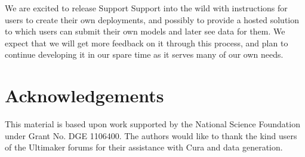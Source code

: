 \documentclass{sigchi}
\begin{document}
We are excited to release Support Support into the wild with instructions for users to create their own deployments, and possibly to provide a hosted solution to which users can submit their own models and later see data for them.  We expect that we will get more feedback on it through this process, and plan to continue developing it in our spare time as it serves many of our own needs.

\section{Acknowledgements}
This material is based upon work supported by the National Science Foundation under Grant No. DGE 1106400.  The authors would like to thank the kind users of the Ultimaker forums for their assistance with Cura and data generation.

\balance

\small

\end{document}
